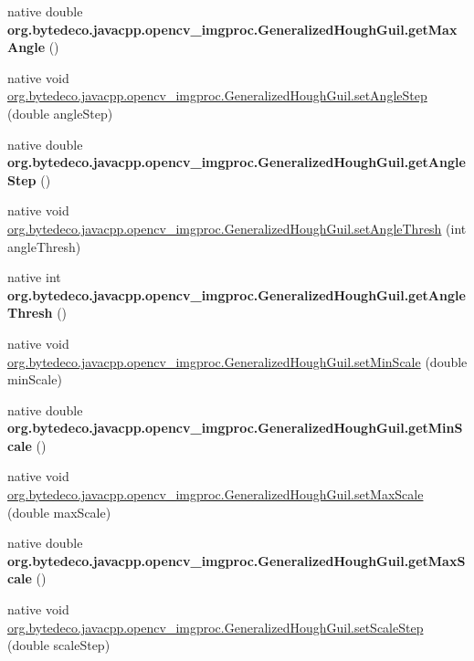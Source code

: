 \begin{DoxyCompactItemize}
\item 
\mbox{\label{group__imgproc_gac7dae1113b123361bb613c007b7f950a}} 
native double {\bfseries org.\+bytedeco.\+javacpp.\+opencv\+\_\+imgproc.\+Generalized\+Hough\+Guil.\+get\+Max\+Angle} ()
\item 
native void \hyperlink{group__imgproc_ga68165aad724a0130724caaa5cbe49aeb}{org.\+bytedeco.\+javacpp.\+opencv\+\_\+imgproc.\+Generalized\+Hough\+Guil.\+set\+Angle\+Step} (double angle\+Step)
\item 
\mbox{\label{group__imgproc_ga23c3c73353e26dde8de0d812da80786d}} 
native double {\bfseries org.\+bytedeco.\+javacpp.\+opencv\+\_\+imgproc.\+Generalized\+Hough\+Guil.\+get\+Angle\+Step} ()
\item 
native void \hyperlink{group__imgproc_gaeba2e2313c8d860e626dd7225d07fca3}{org.\+bytedeco.\+javacpp.\+opencv\+\_\+imgproc.\+Generalized\+Hough\+Guil.\+set\+Angle\+Thresh} (int angle\+Thresh)
\item 
\mbox{\label{group__imgproc_ga758fdf8e8ca2e6cea9e7c204a6fddcb7}} 
native int {\bfseries org.\+bytedeco.\+javacpp.\+opencv\+\_\+imgproc.\+Generalized\+Hough\+Guil.\+get\+Angle\+Thresh} ()
\item 
native void \hyperlink{group__imgproc_gac43dc1513a83e1b7e0744411e0df313b}{org.\+bytedeco.\+javacpp.\+opencv\+\_\+imgproc.\+Generalized\+Hough\+Guil.\+set\+Min\+Scale} (double min\+Scale)
\item 
\mbox{\label{group__imgproc_ga09143d2b79f42e218b4e1b65a2fb2b79}} 
native double {\bfseries org.\+bytedeco.\+javacpp.\+opencv\+\_\+imgproc.\+Generalized\+Hough\+Guil.\+get\+Min\+Scale} ()
\item 
native void \hyperlink{group__imgproc_ga742c12ee154e98bd98c81edc1abada8c}{org.\+bytedeco.\+javacpp.\+opencv\+\_\+imgproc.\+Generalized\+Hough\+Guil.\+set\+Max\+Scale} (double max\+Scale)
\item 
\mbox{\label{group__imgproc_gae26bf72d694940401d80938465306605}} 
native double {\bfseries org.\+bytedeco.\+javacpp.\+opencv\+\_\+imgproc.\+Generalized\+Hough\+Guil.\+get\+Max\+Scale} ()
\item 
native void \hyperlink{group__imgproc_gae75f4f7f0497b548ae4b9443c241f1d8}{org.\+bytedeco.\+javacpp.\+opencv\+\_\+imgproc.\+Generalized\+Hough\+Guil.\+set\+Scale\+Step} (double scale\+Step)

\end{DoxyCompactItemize}
